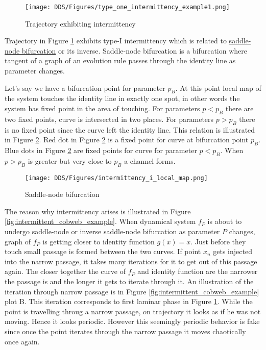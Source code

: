 \begin{figure}[!h]
    \centering
    \texttt{[image: DDS/Figures/type\_one\_intermittency\_example1.png]}
    \caption{Trajectory exhibiting intermittency}
    \label{fig:intermittent_trajectory_example}
\end{figure}

Trajectory in Figure \ref{fig:intermittent_trajectory_example} exhibits type-I intermittency which is related to \hyperref[def:saddle_node_bif]{saddle-node bifurcation} or its inverse.
Saddle-node bifurcation is a bifurcation where tangent of a graph of an evolution rule passes through the identity line as parameter changes.
\par
Let's say we have a bifurcation point for parameter $p_{B}$.
At this point local map of the system touches the identity line in exactly one spot, in other words the system has fixed point in the area of touching.
For parameters $p < p_{B}$ there are two fixed points, curve is intersected in two places.
For parameters $p > p_{B}$ there is no fixed point since the curve left the identity line.
This relation is illustrated in Figure \ref{fig:saddle_node_bifurcation}.
Red dot in Figure \ref{fig:saddle_node_bifurcation} is a fixed point for curve at bifurcation point $p_{B}$.
Blue dots in Figure \ref{fig:saddle_node_bifurcation} are fixed points for curve for parameter $p < p_{B}$.
When $p > p_{B}$ is greater but very close to $p_{B}$ a channel forms.
\begin{figure}[!h]
    \centering
    \texttt{[image: DDS/Figures/intermittency\_i\_local\_map.png]}
    \caption{Saddle-node bifurcation}
    \label{fig:saddle_node_bifurcation}
\end{figure}


The reason why intermittency arises is illustrated in Figure \ref{fig:intermittent_cobweb_example}.
When dynamical system $f_P$ is about to undergo saddle-node or inverse saddle-node bifurcation as parameter $P$ changes, graph of $f_P$ is getting closer to identity function $g(x)=x$.
Just before they touch small passage is formed between the two curves.
If point $x_n$ gets injected into the narrow passage, it takes many iterations for it to get out of this passage again.
The closer together the curve of $f_P$ and identity function are the narrower the passage is and the longer it gets to iterate through it.
An illustration of the iteration through narrow passage is in Figure \ref{fig:intermittent_cobweb_example} plot B.
This iteration corresponds to first laminar phase in Figure \ref{fig:intermittent_trajectory_example}.
While the point is travelling throug a narrow passage, on trajectory it looks as if he was not moving.
Hence it looks periodic.
However this seemingly periodic behavior is fake since once the point iterates through the narrow passage it moves chaotically once again.

